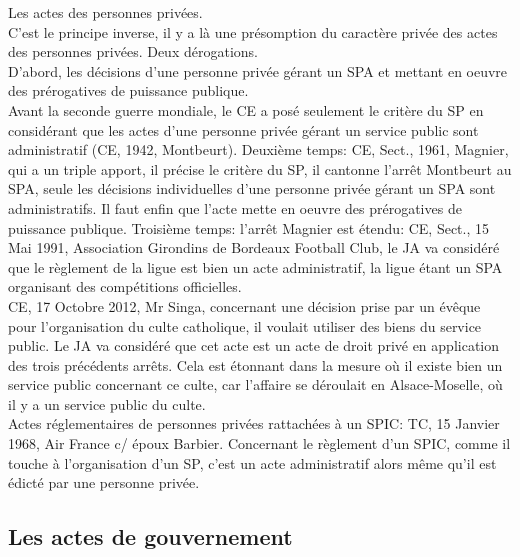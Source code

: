 \documentclass[10pt, a4paper, openany]{book}
\begin{document}
Les actes des personnes privées. \\
C'est le principe inverse, il y a là une présomption du caractère privée des actes des personnes privées. Deux dérogations. \\
D'abord, les décisions d'une personne privée gérant un SPA et mettant en oeuvre des prérogatives de puissance publique. \\
Avant la seconde guerre mondiale, le CE a posé seulement le critère du SP en considérant que les actes d'une personne privée gérant un service public sont administratif (CE, 1942, Montbeurt). Deuxième temps: CE, Sect., 1961, Magnier, qui a un triple apport, il précise le critère du SP, il cantonne l'arrêt Montbeurt au SPA, seule les décisions individuelles d'une personne privée gérant un SPA sont administratifs. Il faut enfin que l'acte mette en oeuvre des prérogatives de puissance publique. Troisième temps: l'arrêt Magnier est étendu: CE, Sect., 15 Mai 1991, Association Girondins de Bordeaux Football Club, le JA va considéré que le règlement de la ligue est bien un acte administratif, la ligue étant un SPA organisant des compétitions officielles. \\
CE, 17 Octobre 2012, Mr Singa, concernant une décision prise par un évêque pour l'organisation du culte catholique, il voulait utiliser des biens du service public. Le JA va considéré que cet acte est un acte de droit privé en application des trois précédents arrêts. Cela est étonnant dans la mesure où il existe bien un service public concernant ce culte, car l'affaire se déroulait en Alsace-Moselle, où il y a un service public du culte. \\
Actes réglementaires de personnes privées rattachées à un SPIC: TC, 15 Janvier 1968, Air France c/ époux Barbier. Concernant le règlement d'un SPIC, comme il touche à l'organisation d'un SP, c'est un acte administratif alors même qu'il est édicté par une personne privée. 

\subsection{Les actes de gouvernement}
\end{document}
